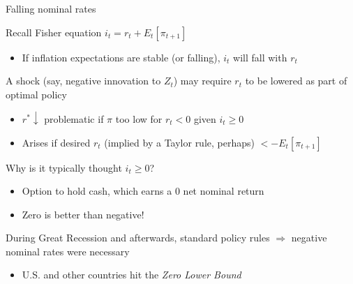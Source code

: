\begin{frame}{Falling nominal rates}

Recall Fisher equation $i_{t} = r_{t} + E_{t}[\pi_{t+1}]$
\begin{itemize}
\item	If inflation expectations are stable (or falling), $i_{t}$ will fall with $r_{t}$
\end{itemize}

\vspace{2mm}
A shock (say, negative innovation to $Z_{t}$) may require $r_{t}$ to be lowered as part of optimal policy
\begin{itemize}
\item	$r^{\ast} \downarrow$ problematic if $\pi$ too low for $r_{t}<0$ given $i_{t}\geq0$
\item	Arises if desired $r_{t}$ (implied by a Taylor rule, perhaps) $< -E_{t}[\pi_{t+1}]$
\end{itemize}

\vspace{2mm}
Why is it typically thought $i_{t}\geq0$?
\begin{itemize}
\item	Option to hold cash, which earns a $0$ net nominal return
\item	Zero is better than negative!
\end{itemize}

\vspace{2mm}
During Great Recession and afterwards, standard policy rules $\Rightarrow$ negative nominal rates were necessary
\begin{itemize}
\item	U.S. and other countries hit the \emph{Zero Lower Bound}
\end{itemize}

\end{frame}


	
